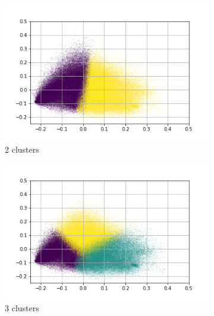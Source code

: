 \begin{figure}
     \centering
     \begin{subfigure}[b]{0.4\textwidth}
         \centering
         \includegraphics[width=\textwidth]{results/TopicDetection/en/PCA_2.png}
         \caption{2 clusters}
         \label{fig:es_kmeans_2}
     \end{subfigure}
     \hfill
     \begin{subfigure}[b]{0.4\textwidth}
         \centering
         \includegraphics[width=\textwidth]{results/TopicDetection/en/PCA_3.png}
         \caption{3 clusters}
         \label{fig:es_kmeans_3}
     \end{subfigure}
     \hfill
     \begin{subfigure}[b]{0.4\textwidth}
         \centering

\end{subfigure}
\end{figure}

